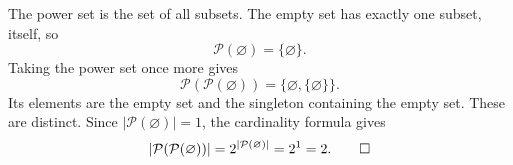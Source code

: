 The power set is the set of all subsets. The empty set has exactly
one subset, itself, so
\[
  \mathcal{P}(\varnothing)=\{\varnothing\}.
\]
Taking the power set once more gives
\[
  \mathcal{P}(\mathcal{P}(\varnothing))
    =\{\varnothing,\{\varnothing\}\}.
\]
Its elements are the empty set and the singleton containing the empty
set. These are distinct. Since $|\mathcal{P}(\varnothing)|=1$, the
cardinality formula gives
\[
  |\mathcal{P}(\mathcal{P}(\varnothing))|
    =2^{|\mathcal{P}(\varnothing)|}=2^1=2.\qedhere
\]
